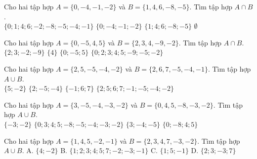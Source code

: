 \begin{ex}
 Cho hai tập hợp $A=\{{0, -4, -1, -2}\}$ và $B=\{{1, 4, 6, -8, -5}\}$. Tìm tập hợp $A\cap B$. \\ 
\choice
{ $\{{0; 1; 4; 6; -2; -8; -5; -4; -1}\}$ }
   { $\{{0; -4; -1; -2}\}$ }
     { $\{{1; 4; 6; -8; -5}\}$ }
    { \True $\emptyset$ }
\loigiai{ 
  
 }\end{ex}

\begin{ex}
 Cho hai tập hợp $A=\{{0, -5, 4, 5}\}$ và $B=\{{2, 3, 4, -9, -2}\}$. Tìm tập hợp $A\cap B$. \\ 
\choice
{ $\{{2; 3; -2; -9}\}$ }
   { \True $\{{4}\}$ }
     { $\{{0; -5; 5}\}$ }
    { $\{{0; 2; 3; 4; 5; -9; -5; -2}\}$ }
\loigiai{ 
  
 }\end{ex}

\begin{ex}
 Cho hai tập hợp $A=\{{2, 5, -5, -4, -2}\}$ và $B=\{{2, 6, 7, -5, -4, -1}\}$. Tìm tập hợp $A\cup B$. \\ 
\choice
{ $\{{5; -2}\}$ }
   { $\{{2; -5; -4}\}$ }
     { $\{{-1; 6; 7}\}$ }
    { \True $\{{2; 5; 6; 7; -1; -5; -4; -2}\}$ }
\loigiai{ 
  
 }\end{ex}

\begin{ex}
 Cho hai tập hợp $A=\{{3, -5, -4, -3, -2}\}$ và $B=\{{0, 4, 5, -8, -3, -2}\}$. Tìm tập hợp $A\cup B$. \\ 
\choice
{ $\{{-3; -2}\}$ }
   { \True $\{{0; 3; 4; 5; -8; -5; -4; -3; -2}\}$ }
     { $\{{3; -4; -5}\}$ }
    { $\{{0; -8; 4; 5}\}$ }
\loigiai{ 
  
 }\end{ex}

\begin{ex}Cho hai tập hợp $A=\{{1, 4, 5, -2, -1}\}$ và $B=\{{2, 3, 4, 7, -3, -2}\}$. Tìm tập hợp $A\cup B$.
\choice
{A. $\{{4; -2}\}$}
   {\True B. $\{{1; 2; 3; 4; 5; 7; -2; -3; -1}\}$}
     {C. $\{{1; 5; -1}\}$}
    {D. $\{{2; 3; -3; 7}\}$}
\end{ex}

